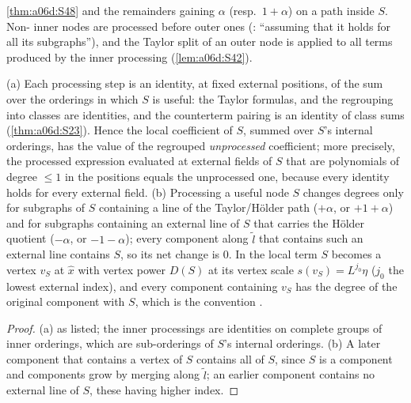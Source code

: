 \cref{thm:a06d:S48} and the remainders gaining $\alpha$ (resp.\ $1+\alpha$) on a path inside $S$. Non-\cite[(2.4)]{Ba3} inner nodes are processed before outer ones (\cite[p.~445]{Ba3}: ``assuming that it holds for all its subgraphs''), and the Taylor split of an outer node is applied to all terms produced by the inner processing (\cref{lem:a06d:S42}).

\begin{lemma}\label{lem:a06d:S41}
\textup{(a)} Each processing step is an identity, at fixed external positions, of the sum over the orderings in which $S$ is useful: the Taylor formulas, \cite[(3.19), (3.26), (3.34), (2.8)]{Ba3} and the regrouping into classes are identities, and the counterterm pairing is an identity of class sums (\cref{thm:a06d:S23}). Hence the local coefficient of $S$, summed over $S$'s internal orderings, has the value of the regrouped \emph{unprocessed} coefficient; more precisely, the processed expression evaluated at external fields of $S$ that are polynomials of degree $\le1$ in the positions equals the unprocessed one, because every identity holds for every external field. \textup{(b)} Processing a useful node $S$ changes degrees only for subgraphs of $S$ containing a line of the Taylor/H\"older path ($+\alpha$, or $+1+\alpha$) and for subgraphs containing an external line of $S$ that carries the H\"older quotient ($-\alpha$, or $-1-\alpha$); every component along $\tilde l$ that contains such an external line contains $S$, so its net change is $0$. In the local term $S$ becomes a vertex $v_S$ at $\hat x$ with vertex power $D(S)$ at its vertex scale $s(v_S)=L^{j_0}\eta$ ($j_0$ the lowest external index), and every component containing $v_S$ has the degree of the original component with $S$, which is the convention \cite[(2.3)]{Ba3}.
\end{lemma}

\begin{proof}
(a) as listed; the inner processings are identities on complete groups of inner orderings, which are sub-orderings of $S$'s internal orderings. (b) A later component that contains a vertex of $S$ contains all of $S$, since $S$ is a component and components grow by merging along $\tilde l$; an earlier component contains no external line of $S$, these having higher index.
\end{proof}

